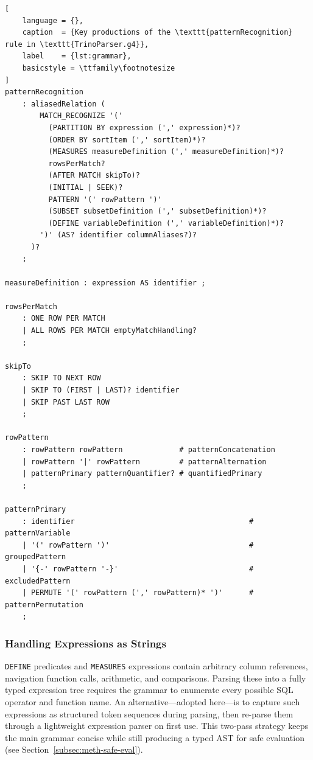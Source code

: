 \begin{lstlisting}[
    language = {},
    caption  = {Key productions of the \texttt{patternRecognition} rule in \texttt{TrinoParser.g4}},
    label    = {lst:grammar},
    basicstyle = \ttfamily\footnotesize
]
patternRecognition
    : aliasedRelation (
        MATCH_RECOGNIZE '('
          (PARTITION BY expression (',' expression)*)?
          (ORDER BY sortItem (',' sortItem)*)?
          (MEASURES measureDefinition (',' measureDefinition)*)?
          rowsPerMatch?
          (AFTER MATCH skipTo)?
          (INITIAL | SEEK)?
          PATTERN '(' rowPattern ')'
          (SUBSET subsetDefinition (',' subsetDefinition)*)?
          (DEFINE variableDefinition (',' variableDefinition)*)?
        ')' (AS? identifier columnAliases?)?
      )?
    ;

measureDefinition : expression AS identifier ;

rowsPerMatch
    : ONE ROW PER MATCH
    | ALL ROWS PER MATCH emptyMatchHandling?
    ;

skipTo
    : SKIP TO NEXT ROW
    | SKIP TO (FIRST | LAST)? identifier
    | SKIP PAST LAST ROW
    ;

rowPattern
    : rowPattern rowPattern             # patternConcatenation
    | rowPattern '|' rowPattern         # patternAlternation
    | patternPrimary patternQuantifier? # quantifiedPrimary
    ;

patternPrimary
    : identifier                                        # patternVariable
    | '(' rowPattern ')'                                # groupedPattern
    | '{-' rowPattern '-}'                              # excludedPattern
    | PERMUTE '(' rowPattern (',' rowPattern)* ')'      # patternPermutation
    ;
\end{lstlisting}

\subsubsection{Handling Expressions as Strings}
\label{subsubsec:meth-expr-strings}

\texttt{DEFINE} predicates and \texttt{MEASURES} expressions contain
arbitrary column references, navigation function calls, arithmetic,
and comparisons.  Parsing these into a fully typed expression tree
requires the grammar to enumerate every possible SQL operator and
function name.  An alternative---adopted here---is to capture such
expressions as structured token sequences during parsing, then
re-parse them through a lightweight expression parser on first use.
This two-pass strategy keeps the main grammar concise while still
producing a typed AST for safe evaluation (see
Section~\ref{subsec:meth-safe-eval}).

